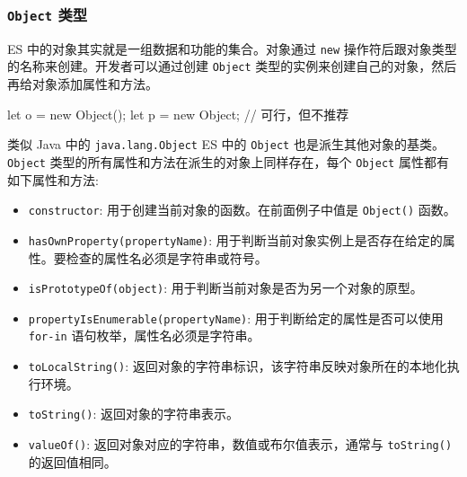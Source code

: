 
\subsubsection{\texttt{Object} 类型}

ES 中的对象其实就是一组数据和功能的集合。对象通过 \texttt{new} 操作符后跟对象类型的名称来创建。开发者可以通过创建 \texttt{Object} 类型的实例来创建自己的对象，然后再给对象添加属性和方法。

\begin{JavaScript}
let o = new Object();
let p = new Object;     // 可行，但不推荐
\end{JavaScript}

类似 Java 中的 \texttt{java.lang.Object} ES 中的 \texttt{Object} 也是派生其他对象的基类。 \texttt{Object} 类型的所有属性和方法在派生的对象上同样存在，每个 \texttt{Object} 属性都有如下属性和方法:

\begin{itemize}
    \item \texttt{constructor}: 用于创建当前对象的函数。在前面例子中值是 \texttt{Object()} 函数。
    \item \texttt{hasOwnProperty(propertyName)}: 用于判断当前对象实例上是否存在给定的属性。要检查的属性名必须是字符串或符号。
    \item \texttt{isPrototypeOf(object)}: 用于判断当前对象是否为另一个对象的原型。
    \item \texttt{propertyIsEnumerable(propertyName)}: 用于判断给定的属性是否可以使用 \texttt{for-in} 语句枚举，属性名必须是字符串。
    \item \texttt{toLocalString()}: 返回对象的字符串标识，该字符串反映对象所在的本地化执行环境。
    \item \texttt{toString()}: 返回对象的字符串表示。
    \item \texttt{valueOf()}: 返回对象对应的字符串，数值或布尔值表示，通常与 \texttt{toString()} 的返回值相同。
\end{itemize}


